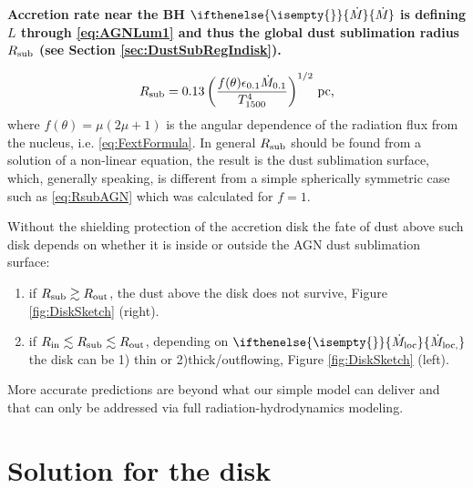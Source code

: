 \documentclass[12pt,english,preprint]{aastex}
\newcommand{\mybf}{\bf}
\newcommand{\su}[2]{#1_{\rm #2}}
\newcommand{\mdt}[1][]{ 
  \ifthenelse{\isempty{#1}}
  {\dot{M}_{\rm loc}}
  { {\dot M}_{\rm{loc},{#1}} } 
  } %
\newcommand{\Mdt}[1][]{ 
    \ifthenelse{\isempty{#1}}
    {\dot{M}_{}}
    { {\dot M}_{{#1}} } 
} %
\newcommand{\rsub}{ \su{R}{sub} }
\begin{document}
{\mybf Accretion rate near the BH $\Mdt$ is 
defining $L$ through \eqref{eq:AGNLum1} and thus the global dust sublimation radius $\rsub$ 
(see Section \ref{sec:DustSubRegIndisk}). 

\begin{equation}\label{eq:RsubAGN}
  \su{R}{sub}=0.13\left(\frac{f(\theta)\epsilon_{0.1}{\dot{M}}_{0.1}}{T_{1500}^{4}}\right)^{1/2}\,\text{pc}\mbox{,}
\end{equation}
where $f(\theta)=\mu(2\mu+1)$ is the angular dependence of the radiation flux from the nucleus, i.e. \eqref{eq:FextFormula}. 
In general $\su{R}{sub}$ should be found from a solution of a non-linear equation,
the result is the dust sublimation surface, which, generally speaking, is different from a simple spherically symmetric case such as 
\eqref{eq:RsubAGN} which was calculated for $f=1$. }
Without the shielding protection of the accretion disk the fate of
dust above such disk depends on whether it is inside or outside the
AGN dust sublimation surface:

\begin{enumerate}
  \item if $\rsub \gtrsim \su{R}{out}$, the dust above the disk does not survive, Figure \ref{fig:DiskSketch} (right). 
  \item if $\su{R}{in} \lesssim \rsub \lesssim \su{R}{out}$, depending on $\mdt$ the disk can be 1) thin or 2)thick/outflowing, 
  Figure \ref{fig:DiskSketch} (left).  
\end{enumerate}
More accurate predictions are beyond what our simple model can deliver and that can only be addressed via 
full radiation-hydrodynamics modeling.



\section{Solution for the disk}\label{sec:Solution}
\end{document}
